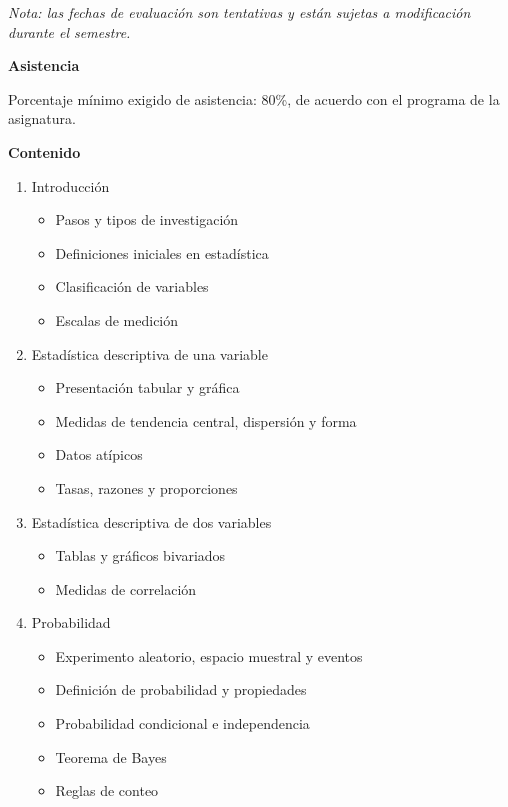 \documentclass[12pt]{article}
\begin{document}
\textit{Nota: las fechas de evaluación son tentativas y están sujetas a modificación durante el semestre.}

\vspace{1.5em}

\textbf{\large Asistencia}

Porcentaje mínimo exigido de asistencia: 80\%, de acuerdo con el programa de la asignatura.

\vspace{1.5em}

\textbf{\large Contenido}

\begin{enumerate}
    \item{Introducción}
    \begin{itemize}
        \item Pasos y tipos de investigación
        \item Definiciones iniciales en estadística
        \item Clasificación de variables
        \item Escalas de medición
    \end{itemize}

    \item{Estadística descriptiva de una variable}
    \begin{itemize}
        \item Presentación tabular y gráfica
        \item Medidas de tendencia central, dispersión y forma
        \item Datos atípicos
        \item Tasas, razones y proporciones
    \end{itemize}

    \item{Estadística descriptiva de dos variables}
    \begin{itemize}
        \item Tablas y gráficos bivariados
        \item Medidas de correlación
    \end{itemize}

    \item{Probabilidad}
    \begin{itemize}
        \item Experimento aleatorio, espacio muestral y eventos
        \item Definición de probabilidad y propiedades
        \item Probabilidad condicional e independencia
        \item Teorema de Bayes
        \item Reglas de conteo
    \end{itemize}


\end{enumerate}
\end{document}

